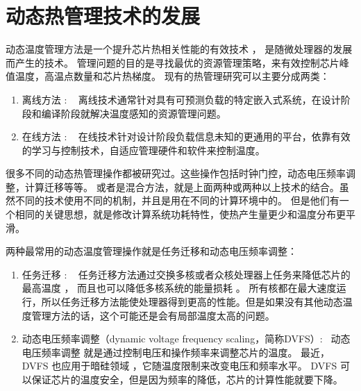 \section{动态热管理技术的发展}\label{sec:his}

动态温度管理方法是一个提升芯片热相关性能的有效技术 ， 是随微处理器的发展而产生的技术。
管理问题的目的是寻找最优的资源管理策略，来有效控制芯片峰值温度，高温点数量和芯片热梯度。
现有的热管理研究可以主要分成两类：
\begin{enumerate}
\item 离线方法 : ~ 离线技术通常针对具有可预测负载的特定嵌入式系统，在设计阶段和编译阶段就解决温度感知的资源管理问题。
\item 在线方法 : ~ 在线技术针对设计阶段负载信息未知的更通用的平台，依靠有效的学习与控制技术，自适应管理硬件和软件来控制温度。
\end{enumerate}

很多不同的动态热管理操作都被研究过。这些操作包括时钟门控，动态电压频率调整，计算迁移等等。
或者是混合方法，就是上面两种或两种以上技术的结合。虽然不同的技术使用不同的机制，并且是用在不同的计算环境中的。
但是他们有一个相同的关键思想，就是修改计算系统功耗特性，使热产生量更少和温度分布更平滑。

两种最常用的动态温度管理操作就是任务迁移和动态电压频率调整：
\begin{enumerate}
\item 任务迁移 :  ~ 任务迁移方法通过交换多核或者众核处理器上任务来降低芯片的最高温度  ，
而且也可以降低多核系统的能量损耗 。
所有核都在最大速度运行，所以任务迁移方法能使处理器得到更高的性能。但是如果没有其他动态温度管理方法的话，这个可能还是会有局部温度太高的问题。
\item 动态电压频率调整（dynamic voltage frequency scaling，简称DVFS）:  ~动态电压频率调整 就是通过控制电压和操作频率来调整芯片的温度。
 最近，DVFS 也应用于暗硅领域 ，它随温度限制来改变电压和频率水平。
 DVFS 可以保证芯片的温度安全，但是因为频率的降低，芯片的计算性能就要下降。
\end{enumerate}


 
 
